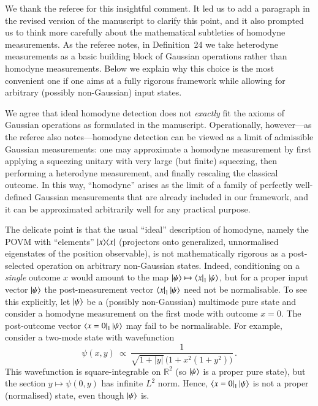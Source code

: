 \documentclass[a4paper,12pt]{article}
\newenvironment{Response}
{\noindent \color{RawSienna}{\bf Response:} }
{\vspace{0.4 cm}}
\begin{document}
\begin{Response}
We thank the referee for this insightful comment. It led us to add a paragraph in the revised version of the manuscript to clarify this point, and it also prompted us to think more carefully about the mathematical subtleties of homodyne measurements. As the referee notes, in Definition~24 we take heterodyne measurements as a basic building block of Gaussian operations rather than homodyne measurements. Below we explain why this choice is the most convenient one if one aims at a fully rigorous framework while allowing for arbitrary (possibly non-Gaussian) input states.



We agree that ideal homodyne detection does not \emph{exactly} fit the axioms of Gaussian operations as formulated in the manuscript. Operationally, however---as the referee also notes---homodyne detection can be viewed as a limit of admissible Gaussian measurements: one may approximate a homodyne measurement by first applying a squeezing unitary with very large (but finite) squeezing, then performing a heterodyne measurement, and finally rescaling the classical outcome. In this way, ``homodyne'' arises as the limit of a family of perfectly well-defined Gaussian measurements that are already included in our framework, and it can be approximated arbitrarily well for any practical purpose.



The delicate point is that the usual ``ideal'' description of homodyne, namely the POVM with ``elements'' $\ket{x}\!\bra{x}$ (projectors onto generalized, unnormalised eigenstates of the position observable), is not mathematically rigorous as a post-selected operation on arbitrary non-Gaussian states. Indeed, conditioning on a \emph{single} outcome $x$ would amount to the map $\ket{\psi}\mapsto \bra{x}_1\ket{\psi}$, but for a proper input vector $\ket{\psi}$ the post-measurement vector $\bra{x}_1\ket{\psi}$ need not be normalisable. To see this explicitly, let $\ket{\psi}$ be a (possibly non-Gaussian) multimode pure state and consider a homodyne measurement on the first mode with outcome $x=0$. The post-outcome vector $\bra{x=0}_1\ket{\psi}$ may fail to be normalisable. For example, consider a two-mode state with wavefunction
\[
\psi(x,y)\ \propto\ \frac{1}{\sqrt{1+|y|}\,\bigl(1+x^2(1+y^2)\bigr)}\,.
\]
This wavefunction is square-integrable on $\mathbb{R}^2$ (so $\ket{\psi}$ is a proper pure state), but the section $y\mapsto \psi(0,y)$ has infinite $L^2$ norm. Hence, $\bra{x=0}_1\ket{\psi}$ is not a proper (normalised) state, even though $\ket{\psi}$ is.



\end{Response}
\end{document}
